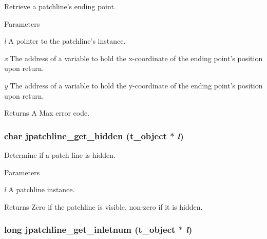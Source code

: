 Retrieve a patchline's ending point. 
\begin{DoxyParams}{Parameters}
\item[{\em l}]A pointer to the patchline's instance. \item[{\em x}]The address of a variable to hold the x-\/coordinate of the ending point's position upon return. \item[{\em y}]The address of a variable to hold the y-\/coordinate of the ending point's position upon return. \end{DoxyParams}
\begin{DoxyReturn}{Returns}
A Max error code. 
\end{DoxyReturn}
\hypertarget{group__jpatchline_gaece283402d2f063de0fec372e7ad8fa5}{
\subsubsection[{jpatchline\_\-get\_\-hidden}]{\setlength{\rightskip}{0pt plus 5cm}char jpatchline\_\-get\_\-hidden ({\bf t\_\-object} $\ast$ {\em l})}}
\label{group__jpatchline_gaece283402d2f063de0fec372e7ad8fa5}


Determine if a patch line is hidden. 
\begin{DoxyParams}{Parameters}
\item[{\em l}]A patchline instance. \end{DoxyParams}
\begin{DoxyReturn}{Returns}
Zero if the patchline is visible, non-\/zero if it is hidden. 
\end{DoxyReturn}
\hypertarget{group__jpatchline_ga01dc2867e149ca5d165a5efd852b80b0}{
\subsubsection[{jpatchline\_\-get\_\-inletnum}]{\setlength{\rightskip}{0pt plus 5cm}long jpatchline\_\-get\_\-inletnum ({\bf t\_\-object} $\ast$ {\em l})}}
\label{group__jpatchline_ga01dc2867e149ca5d165a5efd852b80b0}


